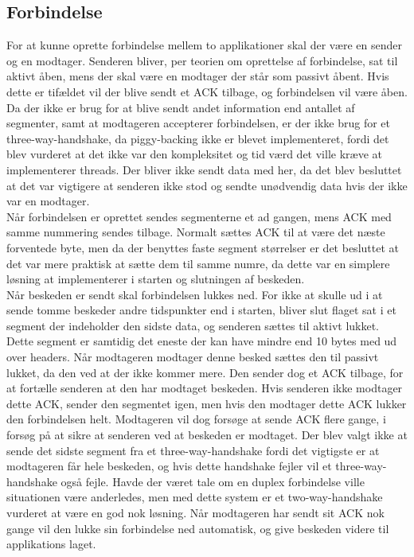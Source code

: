 \subsection{Forbindelse}
For at kunne oprette forbindelse mellem to applikationer skal der være en sender og en modtager. Senderen bliver, per teorien om oprettelse af forbindelse, sat til aktivt åben, mens der skal være en modtager der står som passivt åbent. Hvis dette er tifældet vil der blive sendt et ACK tilbage, og forbindelsen vil være åben. Da der ikke er brug for at blive sendt andet information end antallet af segmenter, samt at modtageren accepterer forbindelsen, er der ikke brug for et three-way-handshake, da piggy-backing ikke er blevet implementeret, fordi det blev vurderet at det ikke var den kompleksitet og tid værd det ville kræve at implementerer threads. Der bliver ikke sendt data med her, da det blev besluttet at det var vigtigere at senderen ikke stod og sendte unødvendig data hvis der ikke var en modtager.
\\
Når forbindelsen er oprettet sendes segmenterne et ad gangen, mens ACK med samme nummering sendes tilbage. Normalt sættes ACK til at være det næste forventede byte, men da der benyttes faste segment størrelser er det besluttet at det var mere praktisk at sætte dem til samme numre, da dette var en simplere løsning at implementerer i starten og slutningen af beskeden. 
\\
Når beskeden er sendt skal forbindelsen lukkes ned. For ikke at skulle ud i at sende tomme beskeder andre tidspunkter end i starten, bliver slut flaget sat i et segment der indeholder den sidste data, og senderen sættes til aktivt lukket. Dette segment er samtidig det eneste der kan have mindre end 10 bytes med ud over headers. Når modtageren modtager denne besked sættes den til passivt lukket, da den ved at der ikke kommer mere. Den sender dog et ACK tilbage, for at fortælle senderen at den har modtaget beskeden. Hvis senderen ikke modtager dette ACK, sender den segmentet igen, men hvis den modtager dette ACK lukker den forbindelsen helt. Modtageren vil dog forsøge at sende ACK flere gange, i forsøg på at sikre at senderen ved at beskeden er modtaget. Der blev valgt ikke at sende det sidste segment fra et three-way-handshake fordi det vigtigste er at modtageren får hele beskeden, og hvis dette handshake fejler vil et three-way-handshake også fejle. Havde der været tale om en duplex forbindelse ville situationen være anderledes, men med dette system er et two-way-handshake vurderet at være en god nok løsning. Når modtageren har sendt sit ACK nok gange vil den lukke sin forbindelse ned automatisk, og give beskeden videre til applikations laget.

